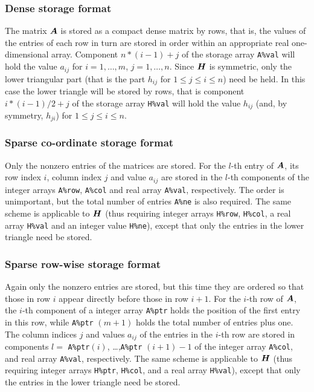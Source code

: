 \documentclass{galahad}
\begin{document}
\subsubsection{Dense storage format}\label{dense}
The matrix ${\bm{A}}$ is stored as a compact 
dense matrix by rows, that is, the values of the entries of each row in turn are
stored in order within an appropriate real one-dimensional array.
Component $n \ast (i-1) + j$ of the storage array {\tt A\%val} will hold the 
value $a_{ij}$ for $i = 1, \ldots , m$, $j = 1, \ldots , n$.
Since ${\bm{H}}$ is symmetric, only the lower triangular part (that is the part 
$h_{ij}$ for $1 \leq j \leq i \leq n$) need be held. In this case
the lower triangle will be stored by rows, that is 
component $i \ast (i-1)/2 + j$ of the storage array {\tt H\%val}  
will hold the value $h_{ij}$ (and, by symmetry, $h_{ji}$)
for $1 \leq j \leq i \leq n$.

\subsubsection{Sparse co-ordinate storage format}\label{coordinate}
Only the nonzero entries of the matrices are stored. For the 
$l$-th entry of ${\bm{A}}$, its row index $i$, column index $j$ 
and value $a_{ij}$
are stored in the $l$-th components of the integer arrays {\tt A\%row}, 
{\tt A\%col} and real array {\tt A\%val}, respectively.
The order is unimportant, but the total
number of entries {\tt A\%ne} is also required. 
The same scheme is applicable to
${\bm{H}}$ (thus requiring integer arrays {\tt H\%row}, {\tt H\%col}, a real array 
{\tt H\%val} and an integer value {\tt H\%ne}),
except that only the entries in the lower triangle need be stored.

\subsubsection{Sparse row-wise storage format}\label{rowwise}
Again only the nonzero entries are stored, but this time
they are ordered so that those in row $i$ appear directly before those
in row $i+1$. For the $i$-th row of ${\bm{A}}$, the $i$-th component of a 
integer array {\tt A\%ptr} holds the position of the first entry in this row,
while {\tt A\%ptr} $(m+1)$ holds the total number of entries plus one.
The column indices $j$ and values $a_{ij}$ of the entries in the $i$-th row 
are stored in components 
$l =$ {\tt A\%ptr}$(i)$, \ldots ,{\tt A\%ptr} $(i+1)-1$ of the 
integer array {\tt A\%col}, and real array {\tt A\%val}, respectively. 
The same scheme is applicable to
${\bm{H}}$ (thus requiring integer arrays {\tt H\%ptr}, {\tt H\%col}, and 
a real array {\tt H\%val}),
except that only the entries in the lower triangle need be stored.
\end{document}

